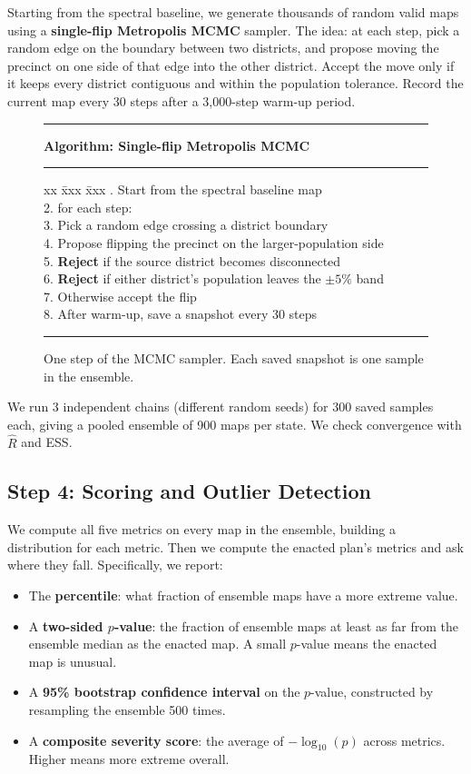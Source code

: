 \documentclass[11pt]{article}
\begin{document}
Starting from the spectral baseline, we generate thousands of random
valid maps using a \textbf{single-flip Metropolis MCMC} sampler. The
idea: at each step, pick a random edge on the boundary between two
districts, and propose moving the precinct on one side of that edge
into the other district. Accept the move only if it keeps every
district contiguous and within the population tolerance. Record the
current map every 30 steps after a 3{,}000-step warm-up period.

\begin{figure}[h]
\hrule\medskip
\noindent\textbf{Algorithm: Single-flip Metropolis MCMC}
\medskip\hrule\medskip
\begin{tabbing}
xx \= xxx \= xxx .\> Start from the spectral baseline map \\
2.\> for each step: \\
3.\> \> Pick a random edge crossing a district boundary \\
4.\> \> Propose flipping the precinct on the larger-population side \\
5.\> \> \textbf{Reject} if the source district becomes disconnected \\
6.\> \> \textbf{Reject} if either district's population leaves the $\pm 5\%$ band \\
7.\> \> Otherwise accept the flip \\
8.\> After warm-up, save a snapshot every 30 steps
\end{tabbing}
\hrule
\caption{One step of the MCMC sampler. Each saved snapshot is one
  sample in the ensemble.}
\end{figure}

We run 3 independent chains (different random seeds) for 300 saved
samples each, giving a pooled ensemble of 900 maps per state. We check
convergence with $\hat{R}$ and ESS.

\subsection{Step 4: Scoring and Outlier Detection}

We compute all five metrics on every map in the ensemble, building a
distribution for each metric. Then we compute the enacted plan's
metrics and ask where they fall. Specifically, we report:
\begin{itemize}
  \item The \textbf{percentile}: what fraction of ensemble maps have a
    more extreme value.
  \item A \textbf{two-sided $p$-value}: the fraction of ensemble maps
    at least as far from the ensemble median as the enacted map. A
    small $p$-value means the enacted map is unusual.
  \item A \textbf{95\% bootstrap confidence interval} on the $p$-value,
    constructed by resampling the ensemble 500 times.
  \item A \textbf{composite severity score}: the average of
    $-\log_{10}(p)$ across metrics. Higher means more extreme overall.
\end{itemize}
\end{document}

